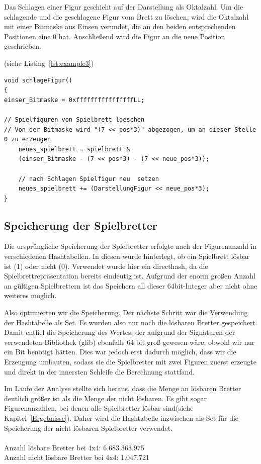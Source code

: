 \documentclass[
	12pt,
	a4paper,
	BCOR10mm,
	DIV14,
	listof=totoc,
	bibliography=totoc,
	headsepline
]{scrreprt}
\begin{document}
Das Schlagen einer Figur geschieht auf der Darstellung als Oktalzahl.
Um die schlagende und die geschlagene Figur vom Brett zu löschen, wird die Oktalzahl mit einer Bitmaske aus Einsen verundet, die an den beiden entsprechenden Positionen eine 0 hat.
Anschließend wird die Figur an die neue Position geschrieben. 


(siehe Listing~\ref{lst:example3})
\begin{lstlisting}[caption={Schlagen einer Figur}, label={lst:example3}]
void schlageFigur()
{
einser_Bitmaske = 0xffffffffffffffffLL;

// Spielfiguren von Spielbrett loeschen 
// Von der Bitmaske wird "(7 << pos*3)" abgezogen, um an dieser Stelle 0 zu erzeugen 
	neues_spielbrett = spielbrett & 
	(einser_Bitmaske - (7 << pos*3) - (7 << neue_pos*3));
	
	// nach Schlagen Spielfigur neu  setzen 
	neues_spielbrett += (DarstellungFigur << neue_pos*3);
}
\end{lstlisting}


\subsection{Speicherung der Spielbretter}

Die ursprüngliche Speicherung der Spielbretter erfolgte nach der Figurenanzahl in verschiedenen Hashtabellen.
In diesen wurde hinterlegt, ob ein Spielbrett lösbar ist (1) oder nicht (0). Verwendet wurde hier ein directhash, da die Spielbrettrepräsentation bereits eindeutig ist.
Aufgrund der enorm großen Anzahl an gültigen Spielbrettern ist das Speichern all dieser 64bit-Integer aber nicht ohne weiteres möglich.

Also optimierten wir die Speicherung. Der nächste Schritt war die Verwendung der Hashtabelle als Set.  
Es wurden also nur noch die lösbaren Bretter gespeichert. Damit entfiel die Speicherung des Wertes, der aufgrund der Signaturen der verwendeten Bibliothek (glib) ebenfalls 64 bit groß gewesen wäre, obwohl wir nur ein Bit benötigt hätten.
Dies war jedoch erst dadurch möglich, dass wir die Erzeugung umbauten, sodass sie die Spielbretter mit zwei Figuren zuerst erzeugte und direkt in der innersten Schleife die Berechnung stattfand.

Im Laufe der Analyse stellte sich heraus, dass die Menge an lösbaren Bretter deutlich größer ist als die Menge der nicht lösbaren. Es gibt sogar Figurenanzahlen, bei denen alle Spielbretter lösbar sind(siehe Kapitel~\ref{Ergebnisse}).
Daher wird die Hashtabelle inzwischen als Set für die Speicherung der nicht lösbaren Spielbretter verwendet.\\
\\
Anzahl lösbare Bretter bei 4x4: 6.683.363.975\\
Anzahl nicht lösbare Bretter bei 4x4: 1.047.721\\
\end{document}
